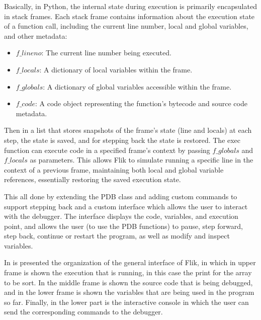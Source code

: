 Basically, in Python, the internal state during execution is primarily encapsulated in 
stack frames. Each stack frame contains information about the execution state of a function 
call, including the current line number, local and global variables, and other metadata:
\begin{itemize}
    \item $f\_lineno$: The current line number being executed.
    \item $f\_locals$: A dictionary of local variables within the frame.
    \item $f\_globals$: A dictionary of global variables accessible within the frame.
    \item $f\_code$: A code object representing the function's bytecode and source code metadata.
\end{itemize}
Then in a list that stores snapshots of the frame's state (line and locals) at each step, the state 
is saved, and for stepping back the state is restored. The exec function can execute code in a 
specified frame's context by passing $f\_globals$ and $f\_locals$ as parameters. This allows 
\ac{Flik} to simulate running a specific line in the context of a previous frame, maintaining 
both local and global variable references, essentially restoring the saved execution state.

This all done by extending the PDB class and adding custom commands to support stepping back
and a custom interface which allows the user to interact with the debugger. The interface 
displays the code, variables, and execution point, and allows the user (to use the \ac{PDB} 
functions) to pause, step forward, step back, continue or restart the program, as well as 
modify and inspect variables. 

In  is presented the organization of the general interface of \ac{Flik}, 
in which in upper frame is shown the execution that is running, in this case the print 
for the array to be sort. In the middle frame is shown the source code that is being 
debugged, and in the lower frame is shown the variables that are being used in the 
program so far. Finally, in the lower part is the interactive console in which the user can 
send the corresponding commands to the debugger.

